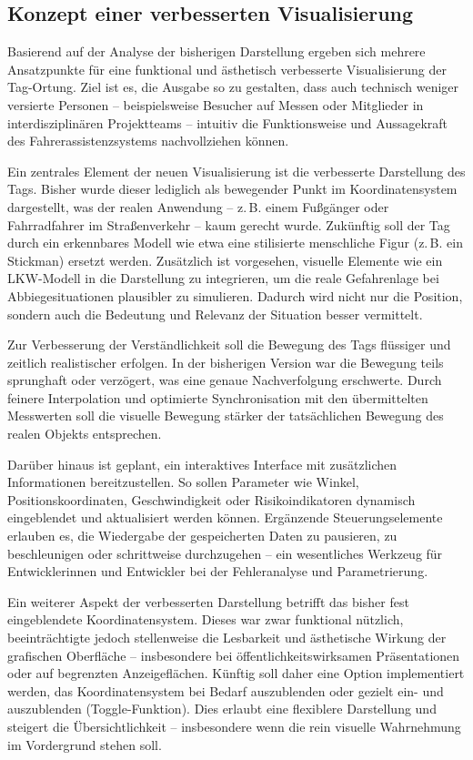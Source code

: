 \documentclass[a4paper, 12pt]{article} %
\begin{document}
\subsection{Konzept einer verbesserten Visualisierung}

Basierend auf der Analyse der bisherigen Darstellung ergeben sich mehrere Ansatzpunkte für eine funktional und ästhetisch verbesserte Visualisierung
 der Tag-Ortung. Ziel ist es, die Ausgabe so zu gestalten, dass auch technisch weniger versierte Personen – beispielsweise Besucher auf Messen oder 
 Mitglieder in interdisziplinären Projektteams – intuitiv die Funktionsweise und Aussagekraft des Fahrerassistenzsystems nachvollziehen können.

Ein zentrales Element der neuen Visualisierung ist die verbesserte Darstellung des Tags. Bisher wurde dieser lediglich als bewegender Punkt im 
Koordinatensystem dargestellt, was der realen Anwendung – z.\,B. einem Fußgänger oder Fahrradfahrer im Straßenverkehr – kaum gerecht wurde. Zukünftig 
soll der Tag durch ein erkennbares Modell wie etwa eine stilisierte menschliche Figur (z.\,B. ein Stickman) ersetzt werden. Zusätzlich ist vorgesehen,
 visuelle Elemente wie ein LKW-Modell in die Darstellung zu integrieren, um die reale Gefahrenlage bei Abbiegesituationen plausibler zu simulieren. 
 Dadurch wird nicht nur die Position, sondern auch die Bedeutung und Relevanz der Situation besser vermittelt.

Zur Verbesserung der Verständlichkeit soll die Bewegung des Tags flüssiger und zeitlich realistischer erfolgen. In der bisherigen Version war die 
Bewegung teils sprunghaft oder verzögert, was eine genaue Nachverfolgung erschwerte. Durch feinere Interpolation und optimierte Synchronisation mit 
den übermittelten Messwerten soll die visuelle Bewegung stärker der tatsächlichen Bewegung des realen Objekts entsprechen.

Darüber hinaus ist geplant, ein interaktives Interface mit zusätzlichen Informationen bereitzustellen. So sollen Parameter wie Winkel, 
Positionskoordinaten, Geschwindigkeit oder Risikoindikatoren dynamisch eingeblendet und aktualisiert werden können. Ergänzende Steuerungselemente erlauben
 es, die Wiedergabe der gespeicherten Daten zu pausieren, zu beschleunigen oder schrittweise durchzugehen – ein wesentliches Werkzeug für Entwicklerinnen 
 und Entwickler bei der Fehleranalyse und Parametrierung.

Ein weiterer Aspekt der verbesserten Darstellung betrifft das bisher fest eingeblendete Koordinatensystem. Dieses war zwar funktional nützlich,
 beeinträchtigte jedoch stellenweise die Lesbarkeit und ästhetische Wirkung der grafischen Oberfläche – insbesondere bei öffentlichkeitswirksamen 
 Präsentationen oder auf begrenzten Anzeigeflächen. Künftig soll daher eine Option implementiert werden, das Koordinatensystem bei Bedarf auszublenden 
 oder gezielt ein- und auszublenden (Toggle-Funktion). Dies erlaubt eine flexiblere Darstellung und steigert die Übersichtlichkeit – insbesondere wenn 
 die rein visuelle Wahrnehmung im Vordergrund stehen soll.
\end{document}
